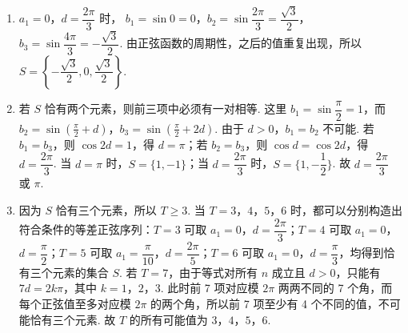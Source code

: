 \begin{solution}
\begin{enumerate}
\item \(a_1=0\)，\(d=\dfrac{2\pi}{3}\) 时，
\(b_1=\sin0=0\)，\(b_2=\sin\dfrac{2\pi}{3}=\dfrac{\sqrt3}{2}\)，\(b_3=\sin\dfrac{4\pi}{3}=-\dfrac{\sqrt3}{2}\).
由正弦函数的周期性，之后的值重复出现，所以
\(S=\left\{-\dfrac{\sqrt3}{2},0,\dfrac{\sqrt3}{2}\right\}\).

\item 若 \(S\) 恰有两个元素，则前三项中必须有一对相等. 这里 \(b_1=\sin\dfrac\pi2=1\)，而
\(b_2=\sin\left(\frac\pi2+d\right)\)，\(b_3=\sin\left(\frac\pi2+2d\right)\).
由于 \(d>0\)，\(b_1=b_2\) 不可能. 若 \(b_1=b_3\)，则 \(\cos 2d=1\)，得 \(d=\pi\)；若 \(b_2=b_3\)，则 \(\cos d=\cos 2d\)，得 \(d=\dfrac{2\pi}{3}\). 当 \(d=\pi\) 时，\(S=\{1,-1\}\)；当 \(d=\dfrac{2\pi}{3}\) 时，\(S=\{1,-\dfrac12\}\). 故 \(d=\dfrac{2\pi}{3}\) 或 \(\pi\).

\item 因为 \(S\) 恰有三个元素，所以 \(T\ge3\). 当 \(T=3\)，\(4\)，\(5\)，\(6\) 时，都可以分别构造出符合条件的等差正弦序列：\(T=3\) 可取 \(a_1=0\)，\(d=\dfrac{2\pi}{3}\)；\(T=4\) 可取 \(a_1=0\)，\(d=\dfrac\pi2\)；\(T=5\) 可取 \(a_1=\dfrac\pi{10}\)，\(d=\dfrac{2\pi}{5}\)；\(T=6\) 可取 \(a_1=0\)，\(d=\dfrac\pi3\)，均得到恰有三个元素的集合 \(S\). 若 \(T=7\)，由于等式对所有 \(n\) 成立且 \(d>0\)，只能有 \(7d=2k\pi\)，其中 \(k=1\)，\(2\)，\(3\). 此时前 7 项对应模 \(2\pi\) 两两不同的 7 个角，而每个正弦值至多对应模 \(2\pi\) 的两个角，所以前 7 项至少有 4 个不同的值，不可能恰有三个元素. 故 \(T\) 的所有可能值为 \(3\)，\(4\)，\(5\)，\(6\).
\end{enumerate}
\end{solution}
